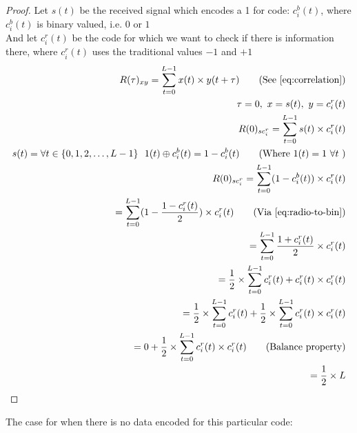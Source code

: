 		\begin{proof}
			Let $s(t)$ be the received signal which encodes a 1 for code: $c^b_i(t)$, where $c^b_i(t)$ is binary valued, i.e. $0$ or $1$ \\
			And let $c^r_i(t)$ be the code for which we want to check if there is information there, where $c^r_i(t)$ uses the traditional values $-1$ and $+1$ \\

			\begin{align*}
				R(\tau)_{xy} = \displaystyle\sum_{t = 0} ^ {L - 1} x(t) \times y(t + \tau)	\tag{See \autoref{eq:correlation}}
				\\ \tau = 0,\ x = s(t),\ y = c^r_i(t)	
				\\ R(0)_{sc^r_{i}} = \displaystyle\sum_{t = 0} ^ {L - 1} s(t) \times c^r_i(t)	
				\\ s(t) = \forall t \in \{ 0, 1, 2, \dotsc, L - 1 \} \ \ 1(t) \oplus c^b_i(t) = 1 - c^b_i(t) \tag{Where $1(t) = 1 \ \forall t$ }
				\\ R(0)_{sc^r_{i}} = \displaystyle\sum_{t = 0} ^ {L - 1} (1 - c^b_i(t)) \times c^r_i(t)
				\\ = \displaystyle\sum_{t = 0} ^ {L - 1} (1 - \frac{1 - c^r_i(t)}{2}) \times c^r_i(t) \tag{Via \autoref{eq:radio-to-bin}}
				\\ = \displaystyle\sum_{t = 0} ^ {L - 1} \frac{1 + c^r_i(t)}{2} \times c^r_i(t)
				\\ = \frac{1}{2} \times \displaystyle\sum_{t = 0} ^ {L - 1} c^r_i(t) + c^r_i(t) \times c^r_i(t)
				\\ = \frac{1}{2} \times \displaystyle\sum_{t = 0} ^ {L - 1} c^r_i(t) + \frac{1}{2} \times \displaystyle\sum_{t = 0} ^ {L - 1} c^r_i(t) \times c^r_i(t)
				\\ = 0 + \frac{1}{2} \times \displaystyle\sum_{t = 0} ^ {L - 1} c^r_i(t) \times c^r_i(t) \tag{Balance property}
				\\ = \frac{1}{2} \times L
			\end{align*}

		\end{proof}

		The case for when there is no data encoded for this particular code:

